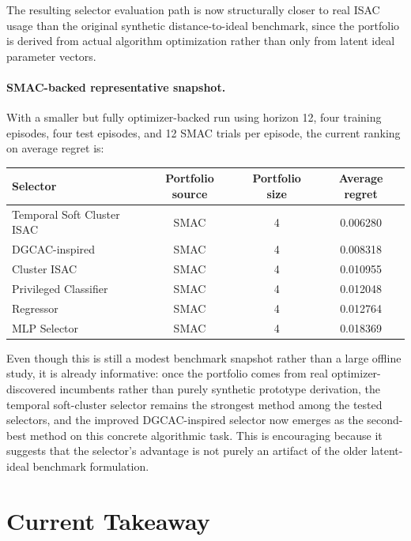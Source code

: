 \documentclass[11pt]{report}
\begin{document}
The resulting selector evaluation path is now structurally closer to real ISAC usage than the original synthetic distance-to-ideal benchmark, since the portfolio is derived from actual algorithm optimization rather than only from latent ideal parameter vectors.

\paragraph{SMAC-backed representative snapshot.}
With a smaller but fully optimizer-backed run using horizon 12, four training episodes, four test episodes, and 12 SMAC trials per episode, the current ranking on average regret is:

\begin{center}
\begin{tabular}{lccc}
\toprule
Selector & Portfolio source & Portfolio size & Average regret \\
\midrule
Temporal Soft Cluster ISAC & SMAC & 4 & 0.006280 \\
DGCAC-inspired & SMAC & 4 & 0.008318 \\
Cluster ISAC & SMAC & 4 & 0.010955 \\
Privileged Classifier & SMAC & 4 & 0.012048 \\
Regressor & SMAC & 4 & 0.012764 \\
MLP Selector & SMAC & 4 & 0.018369 \\
\bottomrule
\end{tabular}
\end{center}

Even though this is still a modest benchmark snapshot rather than a large offline study, it is already informative: once the portfolio comes from real optimizer-discovered incumbents rather than purely synthetic prototype derivation, the temporal soft-cluster selector remains the strongest method among the tested selectors, and the improved DGCAC-inspired selector now emerges as the second-best method on this concrete algorithmic task. This is encouraging because it suggests that the selector's advantage is not purely an artifact of the older latent-ideal benchmark formulation.

\section{Current Takeaway}
\end{document}
